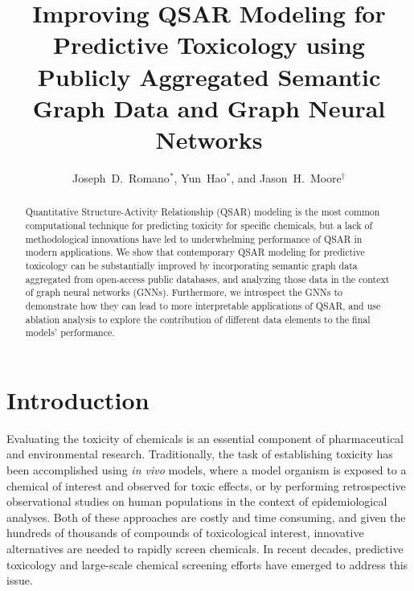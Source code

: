 \documentclass{ws-procs11x85}
\begin{document}
\title{Improving QSAR Modeling for Predictive Toxicology using Publicly Aggregated Semantic Graph Data and Graph Neural Networks}

\author{Joseph~D.~Romano$^*$, Yun~Hao$^*$, and Jason~H.~Moore$^\dag$}

\address{Institute for Biomedical Informatics, University of Pennsylvania,\\
Philadelphia, Pennsylvania 19104, United States\\
$^\dag$E-mail: jhmoore@upenn.edu\\
$^*$These authors contributed equally.}

\begin{abstract}
Quantitative Structure-Activity Relationship (QSAR) modeling is the most common computational technique for predicting toxicity for specific chemicals, but a lack of methodological innovations have led to underwhelming performance of QSAR in modern applications.
We show that contemporary QSAR modeling for predictive toxicology can be substantially improved by incorporating semantic graph data aggregated from open-access public databases, and analyzing those data in the context of graph neural networks (GNNs).
Furthermore, we introspect the GNNs to demonstrate how they can lead to more interpretable applications of QSAR, and use ablation analysis to explore the contribution of different data elements to the final models' performance.
\end{abstract}


\section{Introduction}\label{introduction}
Evaluating the toxicity of chemicals is an essential component of pharmaceutical and environmental research.
Traditionally, the task of establishing toxicity has been accomplished using \textit{in vivo} models, where a model organism is exposed to a chemical of interest and observed for toxic effects, or by performing retrospective observational studies on human populations in the context of epidemiological analyses.
Both of these approaches are costly and time consuming, and given the hundreds of thousands of compounds of toxicological interest, innovative alternatives are needed to rapidly screen chemicals.
In recent decades, predictive toxicology and large-scale chemical screening efforts have emerged to address this issue.
\end{document}
